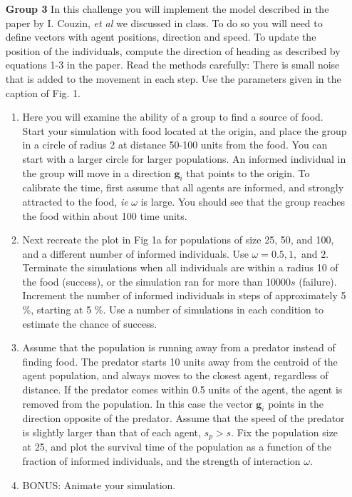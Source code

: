 \documentclass[12pt]{article}
\begin{document}
\begin{enumerate}
\item[\bf Group 3] In this challenge you will implement the model described in the paper by I. Couzin, \emph{et al} we
discussed in class. To do so you will need to define vectors with agent positions, direction and speed.  
To update the position of the individuals, compute the direction of heading as described by equations 1-3 in
the paper. Read the methods carefully: There is small noise that is added to the movement in each step. 
Use the parameters given in the caption of Fig. 1.
\
 \begin{enumerate}
 \item Here you will examine the ability of a group to find a source of food.  Start your simulation with food
 located at the origin, and place the group in a circle of radius 2 at distance 50-100 units from the food.  You can
 start with a larger circle for larger populations.  An informed individual in the group will move in a direction
 ${\mathbf g}_i$ that points to the origin. To calibrate the time, first assume that all agents are informed,
 and strongly attracted to the food, \emph{ie} $\omega$ is large. You should see that the group reaches the food within about 
 100 time units. 
 \item Next recreate the plot in Fig 1a for populations of size 25, 50, and 100, and a different number of informed
 individuals.  Use $\omega = 0.5, 1,$ and $2$.  Terminate the simulations when all individuals are within a radius 10 of the food
 (success), or the simulation ran for more than 10000$s$ (failure).  Increment the number of informed individuals in steps of 
 approximately  5 \%, starting at  5 \%.  Use a number of simulations in each condition to estimate the chance of success.
 \item Assume that the population is running away from a predator instead of finding food.  The predator starts 10 units away from the centroid of the agent population, and always moves to the closest
 agent, regardless of distance. If the predator comes within 0.5 units of the agent, the agent is removed from the population.  In this case the vector  ${\mathbf g}_i$ points in the 
 direction opposite of the predator.  Assume that the speed of the predator  is 
 slightly larger than that of each agent,  $s_p > s$. Fix the population size at 25, and plot the survival time
  of the population as a function of the fraction of informed individuals, and the strength of interaction $\omega$.   
 \item BONUS: Animate your simulation.
 \end{enumerate}
 

\end{enumerate}
\end{document}
